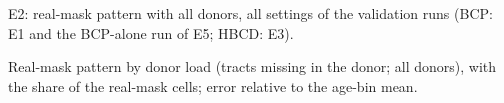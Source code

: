 \documentclass[11pt]{article}
\begin{document}
\begin{table}[h]
\centering\footnotesize
\caption{E2: real-mask pattern with all donors, all settings of the validation runs (BCP: E1 and the BCP-alone run of
E5; HBCD: E3).}\label{tab:realall}
\resizebox{\textwidth}{!}{}
\end{table}

\begin{table}[h]
\centering\footnotesize
\caption{Real-mask pattern by donor load (tracts missing in the donor; all donors), with the share of the real-mask
cells; error relative to the age-bin mean.}\label{tab:realload}
\resizebox{\textwidth}{!}{}
\end{table}
\end{document}
